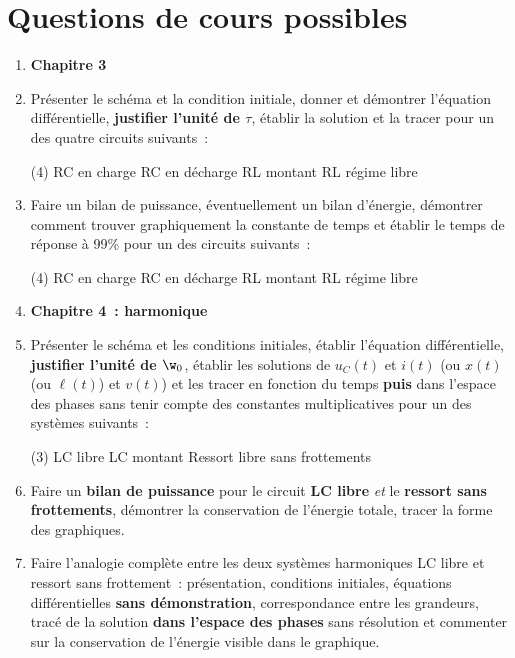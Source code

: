 \documentclass[a4paper, 12pt, final, garamond]{book}
\begin{document}
\section{Questions de cours possibles}
\begin{enumerate}
	\item[] \textbf{Chapitre 3}
	\item Présenter le schéma et la condition initiale, donner et démontrer
        l'équation différentielle, \textbf{justifier l'unité de $\tau$}, établir
        la solution et la tracer pour un des quatre circuits suivants~:
	      \begin{tasks}[label=\protect\fbox{\Alph*}, label-width=4ex](4)
		      \task RC en charge
		      \task RC en décharge
		      \task RL montant
		      \task RL régime libre
	      \end{tasks}
	\item Faire un bilan de puissance, éventuellement un bilan d'énergie,
        démontrer comment trouver graphiquement la constante de temps et établir
        le temps de réponse à 99\% pour un des circuits suivants~:
	      \begin{tasks}[label=\protect\fbox{\Alph*}, label-width=4ex](4)
		      \task RC en charge
		      \task RC en décharge
		      \task RL montant
		      \task RL régime libre
	      \end{tasks}
	\item[] \textbf{Chapitre 4~: harmonique}
	\item Présenter le schéma et les conditions initiales, établir l'équation
        différentielle, \textbf{justifier l'unité de $\w_0$}, établir les
        solutions de $u_C(t)$ et $i(t)$ (ou $x(t)$ (ou $\ell(t)$) et $v(t)$)
        et les tracer en fonction du temps \textbf{puis} dans l'espace des
        phases sans tenir compte des constantes multiplicatives pour un des
        systèmes suivants~:
	      \begin{tasks}[label=\protect\fbox{\Alph*}, label-width=4ex](3)
		      \task LC libre
		      \task LC montant
          \task Ressort libre sans frottements
	      \end{tasks}

  \item Faire un \textbf{bilan de puissance} pour le circuit \textbf{LC libre}
      \textit{et} le \textbf{ressort sans frottements}, démontrer la
      conservation de l'énergie totale, tracer la forme des graphiques.

  \item Faire l'analogie complète entre les deux systèmes harmoniques LC libre
      et ressort sans frottement~: présentation, conditions initiales,
      équations différentielles \textbf{sans démonstration}, correspondance
      entre les grandeurs, tracé de la solution \textbf{dans l'espace des
      phases} sans résolution et commenter sur la conservation de l'énergie
      visible dans le graphique.


\end{enumerate}
\end{document}
